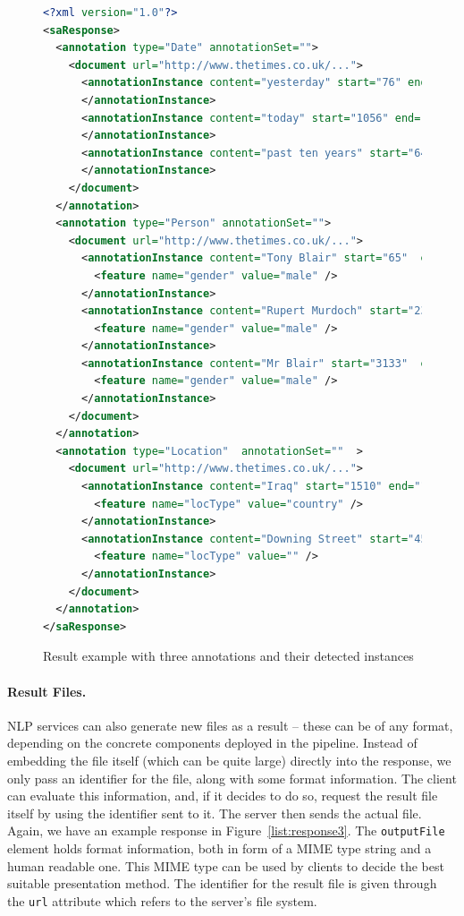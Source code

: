\begin{figure}[htb]
\begin{lstlisting}[language=XML,xleftmargin=8mm,columns=flexible]
<?xml version="1.0"?>
<saResponse>
  <annotation type="Date" annotationSet="">
    <document url="http://www.thetimes.co.uk/...">
      <annotationInstance content="yesterday" start="76" end="85">
      </annotationInstance>
      <annotationInstance content="today" start="1056" end="1061">
      </annotationInstance>
      <annotationInstance content="past ten years" start="6477" end="6491">
      </annotationInstance>
    </document>
  </annotation>
  <annotation type="Person" annotationSet="">
    <document url="http://www.thetimes.co.uk/...">
      <annotationInstance content="Tony Blair" start="65"  end="75">
        <feature name="gender" value="male" />
      </annotationInstance>
      <annotationInstance content="Rupert Murdoch" start="2357" end="2371">
        <feature name="gender" value="male" />
      </annotationInstance>
      <annotationInstance content="Mr Blair" start="3133"  end="3141">
        <feature name="gender" value="male" />
      </annotationInstance>
    </document>
  </annotation>
  <annotation type="Location"  annotationSet=""  >
    <document url="http://www.thetimes.co.uk/...">
      <annotationInstance content="Iraq" start="1510" end="1514">
        <feature name="locType" value="country" />
      </annotationInstance>
      <annotationInstance content="Downing Street" start="4576" end="4590">
        <feature name="locType" value="" />
      </annotationInstance>
    </document>
  </annotation>
</saResponse>
\end{lstlisting}
\vspace*{-2mm}
\caption{Result example with three annotations and their detected instances}
\label{list:response2}
\end{figure}


\paragraph{Result Files.} NLP services can also generate new files as
a result -- these can be of any format, depending on the concrete
components deployed in the pipeline. Instead of embedding the file
itself (which can be quite large) directly into the response, we only
pass an identifier for the file, along with some format information.
The client can evaluate this information, and, if it decides to do so,
request the result file itself by using the identifier sent to it. The
server then sends the actual file. Again, we have an example response
in Figure~\ref{list:response3}. The \texttt{outputFile} element holds
format information, both in form of a MIME type string and a human
readable one. This MIME type can be used by clients to decide the best suitable
presentation method. The identifier for the result file is given through the
\texttt{url} attribute which refers to the server's file system.

